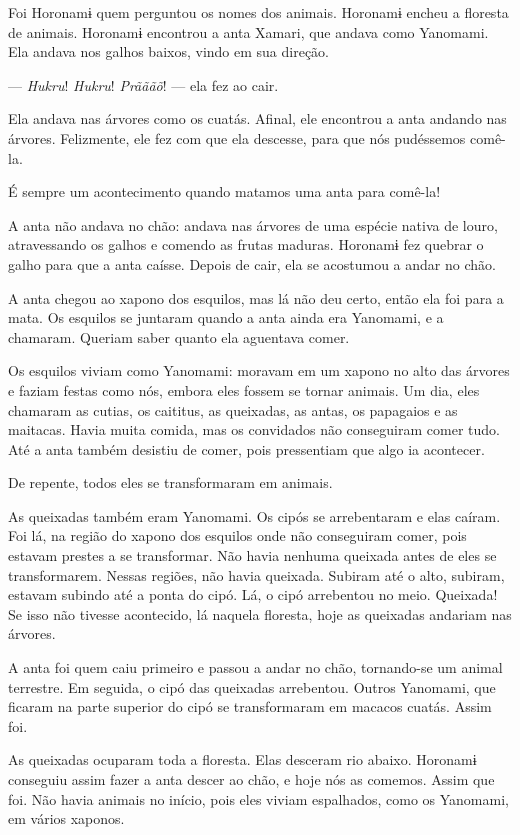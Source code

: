 Foi Horonamɨ quem perguntou os nomes dos animais. Horonamɨ encheu a
floresta de animais. 
Horonamɨ encontrou a anta Xamari, que andava como Yanomami. Ela andava
nos galhos baixos, vindo em sua direção. 

--- \textit{Hukru}! \textit{Hukru}! \textit{Prãããõ}! --- ela fez ao cair. 

Ela andava nas árvores como os cuatás. Afinal, ele encontrou a anta
andando nas árvores. Felizmente, ele fez com que ela descesse, para que
nós pudéssemos comê-la. 

É sempre um acontecimento quando matamos uma anta para comê-la! 

A anta não andava no chão: andava nas árvores de uma espécie nativa de
louro, atravessando os galhos e comendo as frutas maduras. Horonamɨ fez
quebrar o galho para que a anta caísse. Depois de cair, ela se acostumou
a andar no chão. 

A anta chegou ao xapono dos esquilos, mas lá não deu certo, então ela
foi para a mata. Os esquilos se juntaram quando a anta ainda era Yanomami,
e a chamaram. Queriam saber quanto ela aguentava comer.

Os esquilos viviam como Yanomami: moravam em um xapono no alto das
árvores e faziam festas como nós, embora eles fossem se tornar animais.
Um dia, eles chamaram as cutias, os caititus, as queixadas, as antas, os
papagaios e as maitacas. Havia muita comida, mas os convidados não
conseguiram comer tudo. Até a anta também desistiu de comer, pois
pressentiam que algo ia acontecer. 

De repente, todos eles se transformaram em animais. 

As queixadas também eram Yanomami. Os cipós se
arrebentaram e elas caíram. Foi lá, na região do xapono dos esquilos
onde não conseguiram comer, pois estavam prestes a se transformar. Não
havia nenhuma queixada antes de eles se transformarem. Nessas regiões,
não havia queixada. Subiram até o alto, subiram, estavam subindo até a
ponta do cipó. Lá, o cipó arrebentou no meio. Queixada! Se isso não
tivesse acontecido, lá naquela floresta, hoje as queixadas andariam nas
árvores. 

A anta foi quem caiu primeiro e passou a andar no chão, tornando-se um
animal terrestre. Em seguida, o cipó das queixadas arrebentou. Outros
Yanomami, que ficaram na parte superior do cipó se transformaram em
macacos cuatás. Assim foi. 

As queixadas ocuparam toda a floresta. Elas desceram rio abaixo.
Horonamɨ conseguiu assim fazer a anta descer ao chão, e hoje nós as
comemos. Assim que foi. Não havia animais no início, pois eles viviam
espalhados, como os Yanomami, em vários xaponos. 

